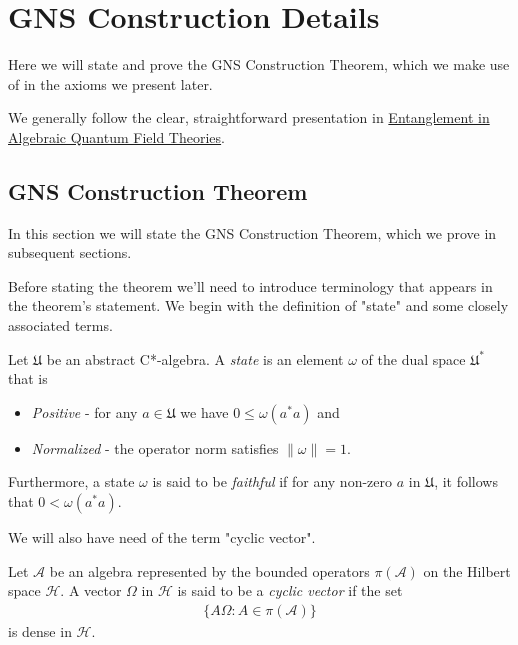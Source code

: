 \section{GNS Construction Details}\label{sctn:gns-construction-details}
Here we will state and prove the GNS Construction Theorem, which we make use of in the axioms we present later.

We generally follow the clear, straightforward presentation in \href{https://arxiv.org/abs/2410.16599}{Entanglement in Algebraic Quantum Field Theories}.

\subsection{GNS Construction Theorem}
In this section we will state the GNS Construction Theorem, which we prove in subsequent sections.

Before stating the theorem we'll need to introduce terminology that appears in the theorem's statement. We begin with the definition of "state" and some closely associated terms.

\begin{definition}[State]
    \label{def:state}
    \leanok
    Let $\mathfrak{U}$ be an abstract C*-algebra. A \textit{state} is an element $\omega$ of the dual space $\mathfrak{U}^*$ that is
    \begin{itemize}
        \item \textit{Positive} - for any $a \in \mathfrak{U}$ we have $0 \le \omega(a^*a)$ and
        \item \textit{Normalized} - the operator norm satisfies $\| \omega \|=1$.
    \end{itemize}
    Furthermore, a state $\omega$ is said to be \textit{faithful} if for any non-zero $a$ in $\mathfrak{U}$, it follows that $0 < \omega(a^*a)$.
\end{definition}

We will also have need of the term "cyclic vector".

\begin{definition}
    \label{def:cyclic-vector}
    \leanok
    Let $\mathcal{A}$ be an algebra represented by the bounded operators $\pi(\mathcal{A})$ on the Hilbert space $\mathcal{H}$. A vector $\Omega$ in $\mathcal{H}$ is said to be a \textit{cyclic vector} if the set
    \begin{align}
        \{ A\Omega : A \in \pi(\mathcal{A}) \}
    \end{align}
    is dense in $\mathcal{H}$.
\end{definition}

